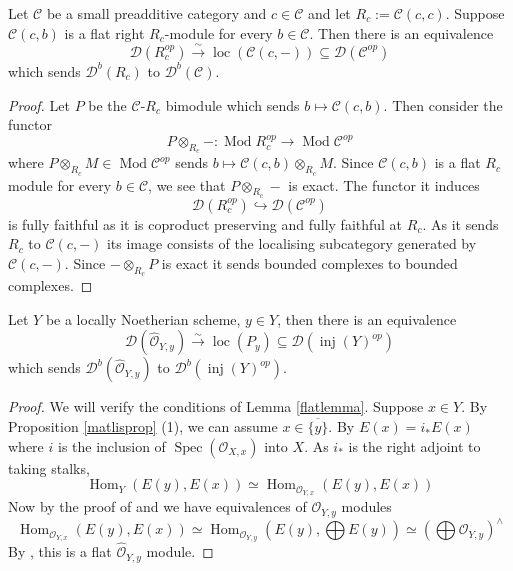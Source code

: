 \documentclass[12pt,oneside]{amsart}
\DeclareMathOperator{\Hom}{Hom}
\DeclareMathOperator{\loc}{loc}
\DeclareMathOperator{\Mod}{Mod}
\DeclareMathOperator{\inj}{inj}
\DeclareMathOperator{\Spec}{Spec}
\begin{document}
\begin{lemma} \label{flatlemma}
Let $\mathcal{C}$ be a small preadditive category and $c \in \mathcal{C}$ and let $R_c := \mathcal{C}(c,c)$. Suppose $\mathcal{C}(c,b)$ is a flat right $R_c$-module for every $b \in \mathcal{C}$. Then there is an equivalence
\[
\mathcal{D}(R_c^{op}) \xrightarrow{\sim} \loc(\mathcal{C}(c,-)) \subseteq \mathcal{D}(\mathcal{C}^{op})
\]
which sends $\mathcal{D}^b(R_c)$ to $\mathcal{D}^b(\mathcal{C})$. 
\end{lemma}

\begin{proof}
Let $P$ be the  $\mathcal{C}$-$R_c$ bimodule which sends $b \mapsto \mathcal{C}(c,b)$. Then consider the functor
\[
P \otimes_{R_c} -: \Mod R_c^{op} \to \Mod \mathcal{C}^{op}
\]
where $P \otimes_{R_c} M \in \Mod \mathcal{C}^{op}$ sends $b \mapsto \mathcal{C}(c,b) \otimes_{R_c} M$. Since $\mathcal{C}(c,b)$ is a flat $R_c$ module for every $b \in \mathcal{C}$, we see that $P \otimes_{R_c} -$ is exact. The functor it induces 
\[
\mathcal{D}(R_c^{op}) \hookrightarrow \mathcal{D}(\mathcal{C}^{op})
\]
is fully faithful as it is coproduct preserving and fully faithful at $R_c$. As it sends $R_c$ to $\mathcal{C}(c,-)$ its image consists of the localising subcategory generated by $\mathcal{C}(c,-)$. Since $- \otimes_{R_c} P$ is exact it sends bounded complexes to bounded complexes. 
\end{proof}

\begin{lemma} \label{presbound}
Let $Y$ be a locally Noetherian scheme, $y \in Y$, then there is an equivalence
\[
\mathcal{D}(\widehat{\mathcal{O}}_{Y,y}) \xrightarrow{\sim} \loc(P_y) \subseteq \mathcal{D}(\inj(Y)^{op})
\]
which sends $\mathcal{D}^b(\widehat{\mathcal{O}}_{Y,y})$ to $\mathcal{D}^b(\inj(Y)^{op})$. 
\end{lemma}

\begin{proof}
We will verify the conditions of Lemma \ref{flatlemma}. Suppose $x \in Y$. By Proposition \ref{matlisprop} (1), we can assume $x \in \overline{\{y\}}$. By  \cite[II.7]{Har66} $E(x) = i_\ast E(x)$ where $i$ is the inclusion of $\Spec(\mathcal{O}_{X,x})$ into $X$. As $i_\ast$ is the right adjoint to taking stalks, 
\[
\Hom_Y(E(y),E(x)) \simeq \Hom_{\mathcal{O}_{Y,x}}(E(y),E(x))
\]
Now by the proof of \cite[Theorem 3.3.15]{EJ11} and \cite[Theorem 3.4.1 (7)]{EJ11} we have equivalences of $\mathcal{O}_{Y,y}$ modules
\[
\Hom_{\mathcal{O}_{Y,x}}(E(y),E(x)) \simeq \Hom_{\mathcal{O}_{Y,y}}\left(E(y), \bigoplus E(y)\right) \simeq \left( \bigoplus \mathcal{O}_{Y,y} \right)^{\wedge}
\]
By \cite[Tag 0AGW]{stacks-project}, this is a flat $\widehat{\mathcal{O}}_{Y,y}$ module.
\end{proof}
\end{document}
